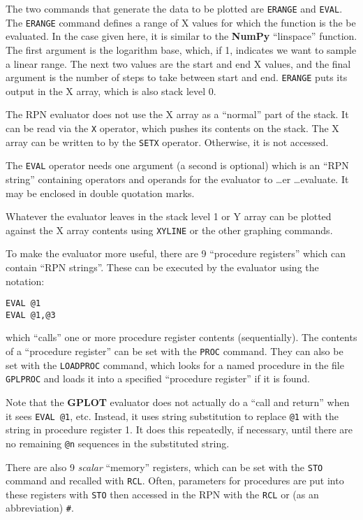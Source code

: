 \documentclass[a4paper,twoside,11pt]{article}
\newcommand{\newpara}{\par\vspace{4mm}\noindent}
\begin{document}
\newpara
The two commands that generate the data to be plotted are
\texttt{ERANGE} and \texttt{EVAL}. The \texttt{ERANGE} command defines a
range of X values for which the function is the be evaluated. In the
case given here, it is similar to the \textbf{NumPy} ``linspace'' function. The
first argument is the logarithm base, which, if 1, indicates we want to
sample a linear range. The next two values are the start and end X
values, and the final argument is the number of steps to take between
start and end. \texttt{ERANGE} puts its output in the X array, which is
also stack level 0.

\newpara
The RPN evaluator does not use the X array as a ``normal'' part of the
stack. It can be read via the \texttt{X} operator, which pushes its
contents on the stack. The X array can be written to by the
\texttt{SETX} operator. Otherwise, it is not accessed.

\newpara
The \texttt{EVAL} operator needs one argument (a second is optional)
which is an ``RPN string'' containing operators and operands for the
evaluator to \ldots er \ldots evaluate. It may be enclosed in double quotation
marks.

\newpara
Whatever the evaluator leaves in the stack level 1 or Y array can be
plotted against the X array contents using \texttt{XYLINE} or the other
graphing commands.

\newpara
To make the evaluator more useful, there are 9 ``procedure registers''
which can contain ``RPN strings''. These can be executed by the
evaluator using the notation:

\begin{lstlisting}
EVAL @1
EVAL @1,@3
\end{lstlisting}

\newpara
which ``calls'' one or more procedure register contents (sequentially).
The contents of a ``procedure register'' can be set with the
\texttt{PROC} command. They can also be set with the \texttt{LOADPROC}
command, which looks for a named procedure in the file \texttt{GPLPROC}
and loads it into a specified ``procedure register'' if it is found.

\newpara
Note that the \textbf{GPLOT} evaluator does not actually do a ``call and return''
when it sees \texttt{EVAL\ @1}, etc. Instead, it uses string
substitution to replace \texttt{@1} with the string in procedure
register 1. It does this repeatedly, if necessary, until there are no
remaining \texttt{@n} sequences in the substituted string.

\newpara
There are also 9 \emph{scalar} ``memory'' registers, which can be set
with the \texttt{STO} command and recalled with \texttt{RCL}. Often,
parameters for procedures are put into these registers with \texttt{STO}
then accessed in the RPN with the \texttt{RCL} or (as an abbreviation)
\texttt{\#}.
\end{document}
